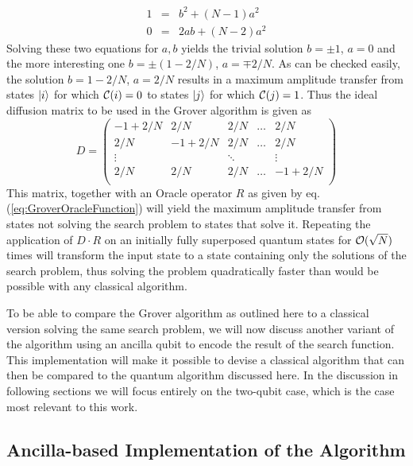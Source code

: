 %
\begin{eqnarray}
 1 & = & b^2+(N-1)a^2 \\
0 & = & 2ab +(N-2)a^2
\end{eqnarray}
%
Solving these two equations for $a,b$ yields the trivial solution $b = \pm 1$, $a = 0$ and the more interesting one $b = \pm(1-2/N)$, $a=\mp 2/N$. As can be checked easily, the solution $b = 1-2/N$, $a = 2/N$ results in a maximum amplitude transfer from states $\left| i \right>$ for which $\Or(i)=0$ to states $\left| j \right>$ for which $\Or(j)=1$. Thus the ideal diffusion matrix to be used in the Grover algorithm is given as
%
\begin{equation}
D = \left( \begin{array}{ccccc}
	-1+2/N & 2/N & 2/N & \hdots & 2/N \\
	2/N & -1 + 2/N & 2/N & \hdots & 2/N \\
	\vdots & & \ddots &  & \vdots \\
	2/N & 2/N & 2/N & \hdots & -1 + 2/N \\ 
	\end{array} \right) \label{eq:GroverDiffusionOperator}
\end{equation}
%
This matrix, together with an Oracle operator $R$ as given by eq. (\ref{eq:GroverOracleFunction}) will yield the maximum amplitude transfer from states not solving the search problem to states that solve it. Repeating the application of $D\cdot R$ on an initially fully superposed quantum states for $\begin{mathcal}O\end{mathcal}(\sqrt{N})$ times will transform the input state to a state containing only the solutions of the search problem, thus solving the problem quadratically faster than would be possible with any classical algorithm.

\smallskip

To be able to compare the Grover algorithm as outlined here to a classical version solving the same search problem, we will now discuss another variant of the algorithm using an ancilla qubit to encode the result of the search function. This implementation will make it possible to devise a classical algorithm that can then be compared to the quantum algorithm discussed here. In the discussion in following sections we will focus entirely on the two-qubit case, which is the case most relevant to this work.

\subsection{Ancilla-based Implementation of the Algorithm}


